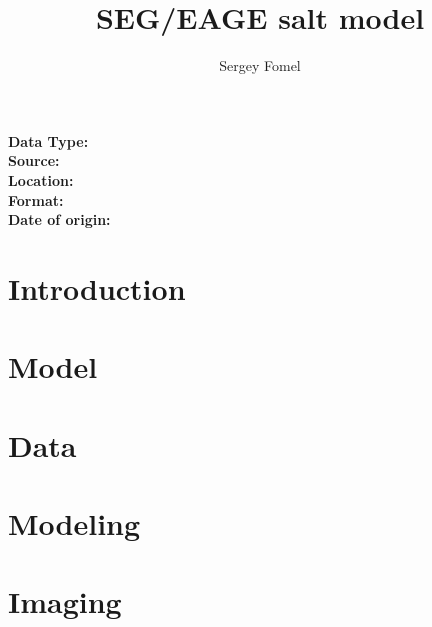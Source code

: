 \title{SEG/EAGE salt model}
\author{Sergey Fomel}
\maketitle

\noindent
\textbf {Data Type:} \\
\textbf {Source:} \\
\textbf {Location:} \\
\textbf {Format:} \\
\textbf{Date of origin:} \\

\section{Introduction}

\section{Model}

\section{Data}

\section{Modeling}

\section{Imaging}




